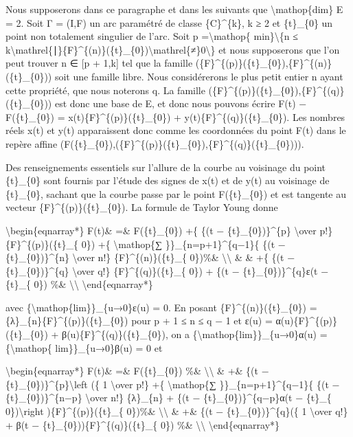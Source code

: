 \documentclass[]{article}
\begin{document}
Nous supposerons dans ce paragraphe et dans les suivants que
\textbackslash{}mathop\{dim\} E = 2. Soit Γ = (I,F) un arc paramétré de
classe \{C\}\^{}\{k\}, k ≥ 2 et \{t\}\_\{0\} un point non totalement
singulier de l'arc. Soit p =\textbackslash{}mathop\{
min\}\textbackslash{}\{n ≤
k\textbackslash{}mathrel\{∣\}\{F\}\^{}\{(n)\}(\{t\}\_\{0\})\textbackslash{}mathrel\{≠\}0\textbackslash{}\}
et nous supposerons que l'on peut trouver n ∈ {[}p + 1,k{]} tel que la
famille (\{F\}\^{}\{(p)\}(\{t\}\_\{0\}),\{F\}\^{}\{(n)\}(\{t\}\_\{0\}))
soit une famille libre. Nous considérerons le plus petit entier n ayant
cette propriété, que nous noterons q. La famille
(\{F\}\^{}\{(p)\}(\{t\}\_\{0\}),\{F\}\^{}\{(q)\}(\{t\}\_\{0\})) est donc
une base de E, et donc nous pouvons écrire F(t) − F(\{t\}\_\{0\}) =
x(t)\{F\}\^{}\{(p)\}(\{t\}\_\{0\}) + y(t)\{F\}\^{}\{(q)\}(\{t\}\_\{0\}).
Les nombres réels x(t) et y(t) apparaissent donc comme les coordonnées
du point F(t) dans le repère affine
(F(\{t\}\_\{0\}),(\{F\}\^{}\{(p)\}(\{t\}\_\{0\}),\{F\}\^{}\{(q)\}(\{t\}\_\{0\}))).

Des renseignements essentiels sur l'allure de la courbe au voisinage du
point \{t\}\_\{0\} sont fournis par l'étude des signes de x(t) et de
y(t) au voisinage de \{t\}\_\{0\}, sachant que la courbe passe par le
point F(\{t\}\_\{0\}) et est tangente au vecteur
\{F\}\^{}\{(p)\}(\{t\}\_\{0\}). La formule de Taylor Young donne

\textbackslash{}begin\{eqnarray*\} F(t)\& =\& F(\{t\}\_\{0\}) +\{ \{(t −
\{t\}\_\{0\})\}\^{}\{p\} \textbackslash{}over p!\}
\{F\}\^{}\{(p)\}(\{t\}\_\{ 0\}) +\{ \textbackslash{}mathop\{∑
\}\}\_\{n=p+1\}\^{}\{q−1\}\{ \{(t − \{t\}\_\{0\})\}\^{}\{n\}
\textbackslash{}over n!\} \{F\}\^{}\{(n)\}(\{t\}\_\{ 0\})\%\&
\textbackslash{}\textbackslash{} \& \& +\{ \{(t −
\{t\}\_\{0\})\}\^{}\{q\} \textbackslash{}over q!\}
\{F\}\^{}\{(q)\}(\{t\}\_\{ 0\}) + \{(t − \{t\}\_\{0\})\}\^{}\{q\}ε(t −
\{t\}\_\{ 0\}) \%\& \textbackslash{}\textbackslash{}
\textbackslash{}end\{eqnarray*\}

avec \{\textbackslash{}mathop\{lim\}\}\_\{u→0\}ε(u) = 0. En posant
\{F\}\^{}\{(n)\}(\{t\}\_\{0\}) =
\{λ\}\_\{n\}\{F\}\^{}\{(p)\}(\{t\}\_\{0\}) pour p + 1 ≤ n ≤ q − 1 et
ε(u) = α(u)\{F\}\^{}\{(p)\}(\{t\}\_\{0\}) +
β(u)\{F\}\^{}\{(q)\}(\{t\}\_\{0\}), on a
\{\textbackslash{}mathop\{lim\}\}\_\{u→0\}α(u)
=\{\textbackslash{}mathop\{ lim\}\}\_\{u→0\}β(u) = 0 et

\textbackslash{}begin\{eqnarray*\} F(t)\& =\& F(\{t\}\_\{0\}) \%\&
\textbackslash{}\textbackslash{} \& +\& \{(t −
\{t\}\_\{0\})\}\^{}\{p\}\textbackslash{}left (\{ 1 \textbackslash{}over
p!\} +\{ \textbackslash{}mathop\{∑ \}\}\_\{n=p+1\}\^{}\{q−1\}\{ \{(t −
\{t\}\_\{0\})\}\^{}\{n−p\} \textbackslash{}over n!\} \{λ\}\_\{n\} + \{(t
− \{t\}\_\{0\})\}\^{}\{q−p\}α(t − \{t\}\_\{ 0\})\textbackslash{}right
)\{F\}\^{}\{(p)\}(\{t\}\_\{ 0\})\%\& \textbackslash{}\textbackslash{} \&
+\& \{(t − \{t\}\_\{0\})\}\^{}\{q\}(\{ 1 \textbackslash{}over q!\} + β(t
− \{t\}\_\{0\}))\{F\}\^{}\{(q)\}(\{t\}\_\{ 0\}) \%\&
\textbackslash{}\textbackslash{} \textbackslash{}end\{eqnarray*\}
\end{document}
